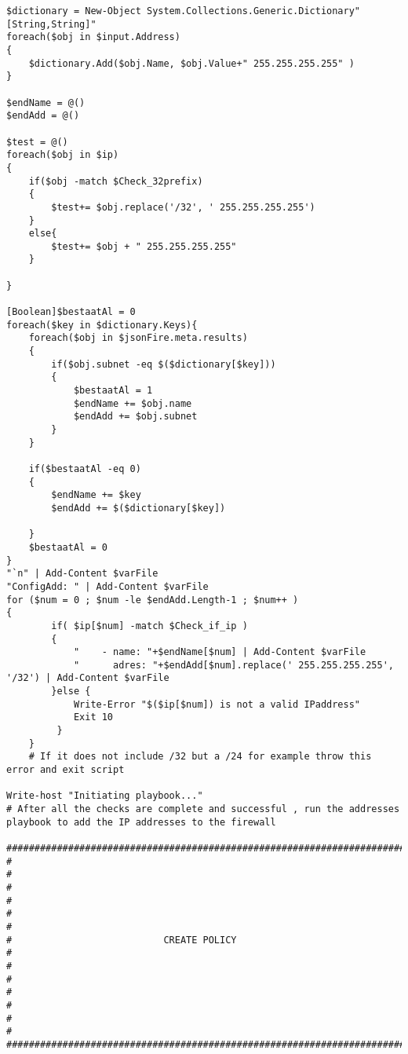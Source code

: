 \documentclass[dutch,dit,thesis]{hogentreport}
\begin{document}
\begin{lstlisting}[caption={main.ps1 Powershell script}]
$dictionary = New-Object System.Collections.Generic.Dictionary"[String,String]" 
foreach($obj in $input.Address)
{
    $dictionary.Add($obj.Name, $obj.Value+" 255.255.255.255" )
}

$endName = @()
$endAdd = @()

$test = @()
foreach($obj in $ip)
{
    if($obj -match $Check_32prefix)
    {
        $test+= $obj.replace('/32', ' 255.255.255.255')
    }
    else{
        $test+= $obj + " 255.255.255.255"
    }
    
}

[Boolean]$bestaatAl = 0
foreach($key in $dictionary.Keys){
    foreach($obj in $jsonFire.meta.results)
    {
        if($obj.subnet -eq $($dictionary[$key]))
        {
            $bestaatAl = 1
            $endName += $obj.name
            $endAdd += $obj.subnet
        }
    }
    
    if($bestaatAl -eq 0)
    {
        $endName += $key
        $endAdd += $($dictionary[$key])

    }
    $bestaatAl = 0
}
"`n" | Add-Content $varFile
"ConfigAdd: " | Add-Content $varFile
for ($num = 0 ; $num -le $endAdd.Length-1 ; $num++ )
{
        if( $ip[$num] -match $Check_if_ip ) 
        {
            "    - name: "+$endName[$num] | Add-Content $varFile
            "      adres: "+$endAdd[$num].replace(' 255.255.255.255', '/32') | Add-Content $varFile 
        }else {
            Write-Error "$($ip[$num]) is not a valid IPaddress"
            Exit 10
         }
    }
    # If it does not include /32 but a /24 for example throw this error and exit script 
   
Write-host "Initiating playbook..."
# After all the checks are complete and successful , run the addresses playbook to add the IP addresses to the firewall

###################################################################################
#                                                                                 #
#                                                                                 #
#                                                                                 #  
#                           CREATE POLICY                                         #             
#                                                                                 #
#                                                                                 #  
#                                                                                 #
###################################################################################


\end{lstlisting}
\end{document}
